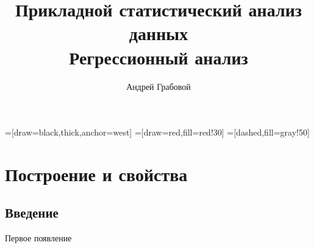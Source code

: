 \documentclass[9pt,pdf,utf8,hyperref={unicode},aspectratio=169]{beamer}
\title[Регрессионный анализ]{Прикладной статистический анализ данных\\ Регрессионный анализ}
\author{Андрей Грабовой}
\date{}
\begin{document}
=[draw=black,thick,anchor=west]
=[draw=red,fill=red!30]
=[dashed,fill=gray!50]

\begin{frame}
    \titlepage
\end{frame}

\section{Построение и свойства}
\subsection{Введение}


\begin{frame}{Первое появление}

\end{frame}
\end{document}
